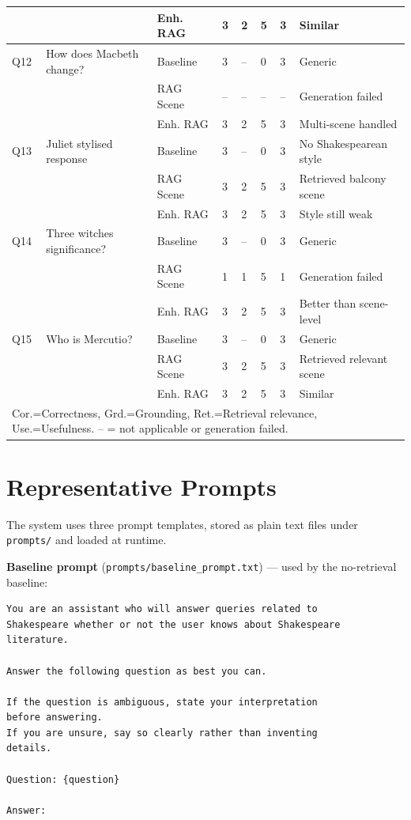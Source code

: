 \documentclass[10pt,conference]{IEEEtran}
\begin{document}
\begin{table}[p]
\begin{tabularx}{\textwidth}{p{0.6cm} p{4cm} p{2.2cm} p{0.8cm} p{0.8cm} p{0.8cm} p{0.8cm} X}
    &                             & Enh. RAG  & 3 & 2 & 5 & 3 & Similar \\
\midrule
Q12 & How does Macbeth change? & Baseline & 3 & -- & 0 & 3 & Generic \\
    &                          & RAG Scene & -- & -- & -- & -- & Generation failed \\
    &                          & Enh. RAG  & 3 & 2 & 5 & 3 & Multi-scene handled \\
\midrule
Q13 & Juliet stylised response & Baseline & 3 & -- & 0 & 3 & No Shakespearean style \\
    &                          & RAG Scene & 3 & 2 & 5 & 3 & Retrieved balcony scene \\
    &                          & Enh. RAG  & 3 & 2 & 5 & 3 & Style still weak \\
\midrule
Q14 & Three witches significance? & Baseline & 3 & -- & 0 & 3 & Generic \\
    &                             & RAG Scene & 1 & 1 & 5 & 1 & Generation failed \\
    &                             & Enh. RAG  & 3 & 2 & 5 & 3 & Better than scene-level \\
\midrule
Q15 & Who is Mercutio? & Baseline & 3 & -- & 0 & 3 & Generic \\
    &                  & RAG Scene & 3 & 2 & 5 & 3 & Retrieved relevant scene \\
    &                  & Enh. RAG  & 3 & 2 & 5 & 3 & Similar \\
\bottomrule
\multicolumn{8}{l}{\footnotesize Cor.=Correctness, Grd.=Grounding, Ret.=Retrieval relevance,
Use.=Usefulness. -- = not applicable or generation failed.}
\end{tabularx}
\end{table}

\section{Representative Prompts}
\label{app:prompts}

The system uses three prompt templates, stored as plain text files
under \texttt{prompts/} and loaded at runtime.

\textbf{Baseline prompt} (\texttt{prompts/baseline\_prompt.txt}) ---
used by the no-retrieval baseline:

\begin{lstlisting}
You are an assistant who will answer queries related to
Shakespeare whether or not the user knows about Shakespeare
literature.

Answer the following question as best you can.

If the question is ambiguous, state your interpretation
before answering.
If you are unsure, say so clearly rather than inventing
details.

Question: {question}

Answer:
\end{lstlisting}
\end{document}
